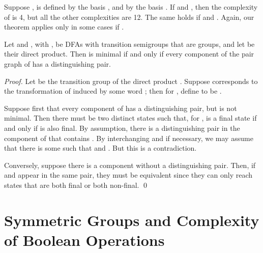 \documentclass{llncs}
\newcommand{\qedb}{\hfill}
\begin{document}
\begin{example}
\label{ex:44}
Suppose ,   is defined by the basis , and   by  the basis
. If  and
,
then the complexity of  is 4, but all the other complexities are 12.
The same holds if  and .
Again, our theorem applies only in some cases if .
\qedb
\end{example}





\begin{lemma}
\label{lem:dist}
Let  and , with , be 
DFAs with transition semigroups  that are groups, and let  be their direct product.
Then  is minimal if and only if every component of the pair graph  of  has a distinguishing pair.
\end{lemma}
\begin{proof}  Let  be the transition group of the direct product .  
Suppose  corresponds to the transformation of  induced by some word ; 
then for , define  to be .

Suppose first that every component of  has a distinguishing pair, but  is not minimal.   Then there must be two distinct states  such that, for ,  is a final state if and only if  is also final.
By assumption, there is a distinguishing pair  in the component of  that contains .  By interchanging  and  if necessary, we may assume that there is some  such that 
 and .  But this is a contradiction.

Conversely, suppose there is a component  without a distinguishing pair. Then, if 
 and  appear in the same pair, they must be equivalent since they can only reach states that are both final or both non-final. 
\qed
\end{proof}



\section{Symmetric Groups and Complexity of Boolean Operations}
\label{sec:main}
\end{document}
